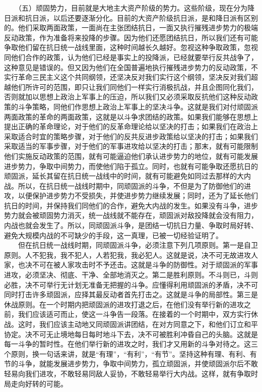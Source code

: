 \documentclass[cn,11pt,chinese]{elegantbook}
\begin{document}
　　（五）顽固势力，目前就是大地主大资产阶级的势力。这些阶级，现在分为降日派和抗日派，以后还要逐渐分化。目前的大资产阶级抗日派，是和降日派有区别的。他们采取两面政策，一面尚在主张团结抗日，一面又执行摧残进步势力的极端反动政策，作为准备将来投降的步骤。因为他们还愿团结抗日，所以我们还有可能争取他们留在抗日统一战线里面，这种时间越长久越好。忽视这种争取政策，忽视同他们合作的政策，认为他们已经是事实上的投降派，已经就要举行反共战争了，这种意见是错误的。但又因为他们在全国普遍地执行摧残进步势力的反动政策，不实行革命三民主义这个共同纲领，还坚决反对我们实行这个纲领，坚决反对我们超越他们所许可的范围，即只让我们同他们一样实行消极抗战，并且企图同化我们，否则就加以思想上政治上军事上的压迫，所以我们又必须采取反抗他们这种反动政策的斗争策略，同他们作思想上政治上军事上的坚决斗争。这就是我们对付顽固派两面政策的革命的两面政策，这就是以斗争求团结的政策。如果我们能够在思想上提出正确的革命理论，对于他们的反革命理论给以坚决的打击；如果我们在政治上采取适合时宜的策略步骤，对于他们的反共反进步政策给以坚决的打击；如果我们采取适当的军事步骤，对于他们的军事进攻给以坚决的打击；那末，就有可能限制他们实施反动政策的范围，就有可能逼迫他们承认进步势力的地位，就有可能发展进步势力，争取中间势力，而使他们陷于孤立。同时，也就有可能争取还愿抗日的顽固派，延长其留在抗日统一战线中的时间，就有可能避免如同过去那样的大内战。所以，在抗日统一战线时期中，同顽固派的斗争，不但是为了防御他们的进攻，以便保护进步势力不受损失，并使进步势力继续发展；同时，还为了延长他们抗日的时间，并保持我们同他们的合作，避免大内战的发生。如果没有斗争，进步势力就会被顽固势力消灭，统一战线就不能存在，顽固派对敌投降就会没有阻力，内战也就会发生了。所以，同顽固派斗争，是团结一切抗日力量、争取时局好转、避免大规模内战的不可缺少的手段，这一真理，已被一切经验证明了。\\
　　但在抗日统一战线时期，同顽固派斗争，必须注意下列几项原则。第一是自卫原则。人不犯我，我不犯人，人若犯我，我必犯人。这就是说，决不可无故进攻人家，也决不可在被人家攻击时不予还击。这就是斗争的防御性。对于顽固派的军事进攻，必须坚决、彻底、干净、全部地消灭之。第二是胜利原则。不斗则已，斗则必胜，决不可举行无计划无准备无把握的斗争。应懂得利用顽固派的矛盾，决不可同时打击许多顽固派，应择其最反动者首先打击之。这就是斗争的局部性。第三是休战原则。在一个时期内把顽固派的进攻打退之后，在他们没有举行新的进攻之前，我们应该适可而止，使这一斗争告一段落。在接着的一个时期中，双方实行休战。这时，我们应该主动地又同顽固派讲团结，在对方同意之下，和他们订立和平协定。决不可无止境地每日每时地斗下去，决不可被胜利冲昏自己的头脑。这就是每一斗争的暂时性。在他们举行新的进攻之时，我们才又用新的斗争对待之。这三个原则，换一句话来讲，就是“有理”，“有利”，“有节”。坚持这种有理、有利、有节的斗争，就能发展进步势力，争取中间势力，孤立顽固派，并使顽固派尔后不敢轻易向我们进攻，不敢轻易同敌人妥协，不敢轻易举行大内战。这样，就有争取时局走向好转的可能。\\
\end{document}
